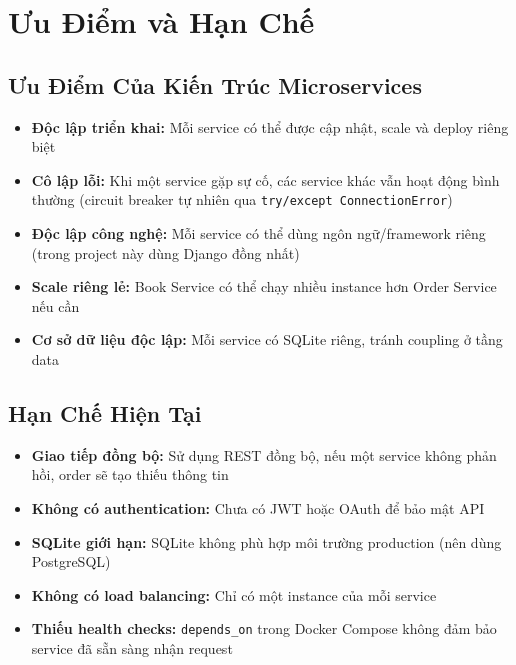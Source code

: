 \documentclass[12pt,a4paper]{article}
\begin{document}
\section{Ưu Điểm và Hạn Chế}

\subsection{Ưu Điểm Của Kiến Trúc Microservices}

\begin{itemize}[leftmargin=1.5cm]
  \item \textbf{Độc lập triển khai:} Mỗi service có thể được cập nhật, scale và deploy riêng biệt
  \item \textbf{Cô lập lỗi:} Khi một service gặp sự cố, các service khác vẫn hoạt động bình thường (circuit breaker tự nhiên qua \texttt{try/except ConnectionError})
  \item \textbf{Độc lập công nghệ:} Mỗi service có thể dùng ngôn ngữ/framework riêng (trong project này dùng Django đồng nhất)
  \item \textbf{Scale riêng lẻ:} Book Service có thể chạy nhiều instance hơn Order Service nếu cần
  \item \textbf{Cơ sở dữ liệu độc lập:} Mỗi service có SQLite riêng, tránh coupling ở tầng data
\end{itemize}

\subsection{Hạn Chế Hiện Tại}

\begin{itemize}[leftmargin=1.5cm]
  \item \textbf{Giao tiếp đồng bộ:} Sử dụng REST đồng bộ, nếu một service không phản hồi, order sẽ tạo thiếu thông tin
  \item \textbf{Không có authentication:} Chưa có JWT hoặc OAuth để bảo mật API
  \item \textbf{SQLite giới hạn:} SQLite không phù hợp môi trường production (nên dùng PostgreSQL)
  \item \textbf{Không có load balancing:} Chỉ có một instance của mỗi service
  \item \textbf{Thiếu health checks:} \texttt{depends\_on} trong Docker Compose không đảm bảo service đã sẵn sàng nhận request
\end{itemize}
\end{document}
